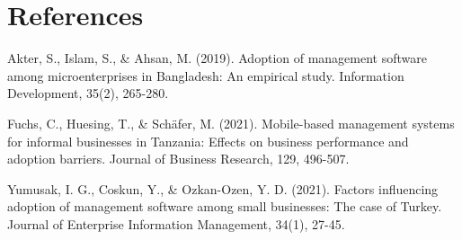 \documentclass{article}
\begin{document}
\section{References}
\renewcommand{\refname}{}
\begin{thebibliography}{10}
	
	Akter, S., Islam, S., \& Ahsan, M. (2019). Adoption of management software among microenterprises in Bangladesh: An empirical study. Information Development, 35(2), 265-280.

	Fuchs, C., Huesing, T., \& Schäfer, M. (2021). Mobile-based management systems for informal businesses in Tanzania: Effects on business performance and adoption barriers. Journal of Business Research, 129, 496-507.

	Yumusak, I. G., Coskun, Y., \& Ozkan-Ozen, Y. D. (2021). Factors influencing adoption of management software among small businesses: The case of Turkey. Journal of Enterprise Information Management, 34(1), 27-45.

\end{thebibliography}
\end{document}
